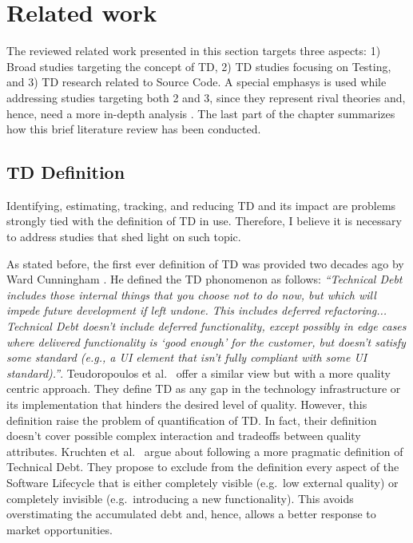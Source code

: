 \chapter{Related work}

The reviewed related work presented in this section targets three aspects: 1) Broad studies targeting the concept of TD, 2) TD studies focusing on Testing, and 3) TD research related to Source Code. A special emphasys is used while addressing studies targeting both 2 and 3, since they represent rival theories and, hence, need a more in-depth analysis \cite{case_study_guide}. The last part of the chapter summarizes how this brief literature review has been conducted.


\section{TD Definition} \label{td_definition}
Identifying, estimating, tracking, and reducing TD and its impact are problems strongly tied with the definition of TD in use. Therefore, I believe it is necessary to address studies that shed light on such topic.

As stated before, the first ever definition of TD was provided two decades ago by Ward Cunningham \cite{first_mention_of_TD}. He defined the TD phonomenon as follows:
\textit{“Technical Debt includes those internal things that you choose
not to do now, but which will impede future development if left
undone. This includes deferred refactoring... Technical Debt doesn't include deferred functionality, except possibly in edge cases where delivered functionality is ‘good enough’ for the customer, but doesn't satisfy some standard (e.g., a UI element that isn't fully compliant with some UI standard).”}. Teudoropoulos et al.\ \cite{td_from_stakeholder_perspective} offer a similar view but with a more quality centric approach. They define TD as any gap in the technology infrastructure or its implementation that hinders the desired level of quality. However, this definition raise the problem of quantification of TD. In fact, their definition doesn't cover possible complex interaction and tradeoffs between quality attributes. %
Kruchten et al.\ \cite{td_from_debt_to_metaphor} argue about following a more pragmatic definition of Technical Debt. They propose to exclude from the definition every aspect of the Software Lifecycle that is either completely visible (e.g.\ low external quality) or completely invisible (e.g.\ introducing a new functionality). This avoids overstimating the accumulated debt and, hence, allows a better response to market opportunities.

